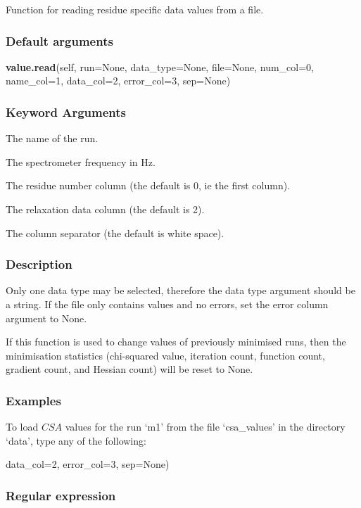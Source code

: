 Function for reading residue specific data values from a file.

\subsubsection{Default arguments}

\textsf{\textbf{value.read}(self, run=None, data\_type=None, file=None, num\_col=0, name\_col=1, data\_col=2, error\_col=3, sep=None)}


\subsubsection{Keyword Arguments}

  The name of the run.

  The spectrometer frequency in Hz.

  The residue number column (the default is 0, ie the first column).

  The relaxation data column (the default is 2).

  The column separator (the default is white space).

\subsubsection{Description}

Only one data type may be selected, therefore the data type argument should be a string.  If
the file only contains values and no errors, set the error column argument to None.

If this function is used to change values of previously minimised runs, then the
minimisation statistics (chi-squared value, iteration count, function count, gradient count,
and Hessian count) will be reset to None.


\subsubsection{Examples}

To load $CSA$ values for the run `m1' from the file `csa\_values' in the directory `data', type
any of the following:


                  data\_col=2, error\_col=3, sep=None)




\subsubsection{Regular expression}


